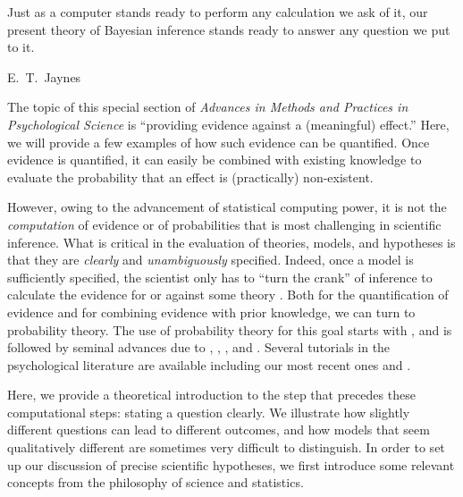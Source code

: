\maketitle

\epigraph{Just as a computer stands ready to perform any calculation we ask of it, our present theory of Bayesian inference stands ready to answer any question we put to it.}{E.\ T.\ Jaynes \protect\cite[p.~382]{rosenkrantz1983jaynes}}

\noindent The topic of this special section of \emph{Advances in Methods and Practices in Psychological Science} is ``providing evidence against a (meaningful) effect.''  Here, we will provide a few examples of how such evidence can be quantified.  Once evidence is quantified, it can easily be combined with existing knowledge to evaluate the probability that an effect is (practically) non-existent.

However, owing to the advancement of statistical computing power, it is not the \textit{computation} of evidence or of probabilities that is most challenging in scientific inference. What is critical in the evaluation of theories, models, and hypotheses is that they are \emph{clearly} and \emph{unambiguously} specified. Indeed, once a model is sufficiently specified, the scientist only has to ``turn the crank'' of inference to calculate the evidence for or against some theory \cite{edwards1963bayesian}. Both for the quantification of evidence and for combining evidence with prior knowledge, we can turn to probability theory.  The use of probability theory for this goal starts with , and is followed by seminal advances due to , , , and .  Several tutorials in the psychological literature are available including our most recent ones  and .

Here, we provide a theoretical introduction to the step that precedes these computational steps: stating a question clearly. We illustrate how slightly different questions can lead to different outcomes, and how models that seem qualitatively different are sometimes very difficult to distinguish. 
In order to set up our discussion of precise scientific hypotheses, we first introduce some relevant concepts from the philosophy of science and statistics.

